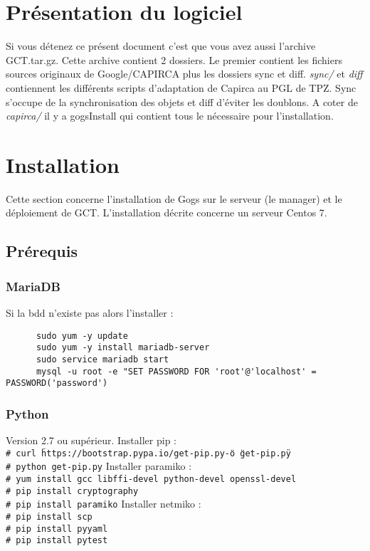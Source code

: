 \documentclass{article}
\newcommand{\shellcmdd}[1]{\\\indent\indent\texttt{\footnotesize\# #1}}
\begin{document}
  \section{Présentation du logiciel}

  Si vous détenez ce présent document c'est que vous avez aussi l'archive GCT.tar.gz. Cette archive contient 2 dossiers.
  Le premier contient les fichiers sources originaux de Google/CAPIRCA plus les dossiers sync et diff. \textit{sync/} et
  \textit{diff} contiennent les différents scripts d'adaptation de Capirca au PGL de TPZ. Sync s'occupe de la synchronisation
  des objets et diff d'éviter les doublons.
  A coter de \textit{capirca/} il y a gogsInstall qui contient tous le nécessaire pour l'installation.

  \section{Installation}

    Cette section concerne l'installation de Gogs sur le serveur (le manager) et le déploiement de GCT.
    L'installation décrite concerne un serveur Centos 7.

    \subsection{Prérequis}
      \subsubsection{MariaDB}

      Si la bdd n'existe pas alors l'installer :
\begin{verbatim}
      sudo yum -y update
      sudo yum -y install mariadb-server
      sudo service mariadb start
      mysql -u root -e "SET PASSWORD FOR 'root'@'localhost' = PASSWORD('password')
\end{verbatim}

      \subsubsection{Python}

      Version 2.7 ou supérieur. \bigbreak
      \noindent Installer pip :
      \noindent\shellcmdd{curl \"https://bootstrap.pypa.io/get-pip.py\" -o \"get-pip.py\"}
      \noindent\shellcmdd{python get-pip.py} \smallbreak
      \noindent Installer paramiko :
      \noindent\shellcmdd{yum install gcc libffi-devel python-devel openssl-devel}
      \noindent\shellcmdd{pip install cryptography}
      \noindent\shellcmdd{pip install paramiko} \smallbreak
      \noindent Installer netmiko :
      \noindent\shellcmdd{pip install scp}
      \noindent\shellcmdd{pip install pyyaml}
      \noindent\shellcmdd{pip install pytest}
\end{document}
